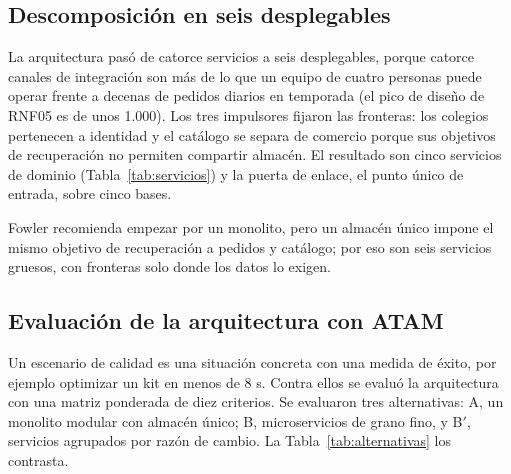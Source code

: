 \subsection{Descomposición en seis desplegables}
\label{sec:consolidacion}

La arquitectura pasó de catorce servicios a seis desplegables, porque catorce canales de integración son más de lo que un equipo de cuatro personas puede operar frente a decenas de pedidos diarios en temporada (el pico de diseño de RNF05 es de unos 1.000). Los tres impulsores fijaron las fronteras: los colegios pertenecen a identidad y el catálogo se separa de comercio porque sus objetivos de recuperación no permiten compartir almacén. El resultado son cinco servicios de dominio (Tabla~\ref{tab:servicios}) y la puerta de enlace, el punto único de entrada, sobre cinco bases.

Fowler \citep{fowler_monolithfirst_2015} recomienda empezar por un monolito, pero un almacén único impone el mismo objetivo de recuperación a pedidos y catálogo; por eso son seis servicios gruesos, con fronteras solo donde los datos lo exigen.


\subsection{Evaluación de la arquitectura con ATAM}
\label{sec:alternativas}

Un escenario de calidad es una situación concreta con una medida de éxito, por ejemplo optimizar un kit en menos de 8 s. Contra ellos se evaluó la arquitectura con una matriz ponderada de diez criterios. Se evaluaron tres alternativas: A, un monolito modular con almacén único; B, microservicios de grano fino, y B$'$, servicios agrupados por razón de cambio. La Tabla~\ref{tab:alternativas} los contrasta.


